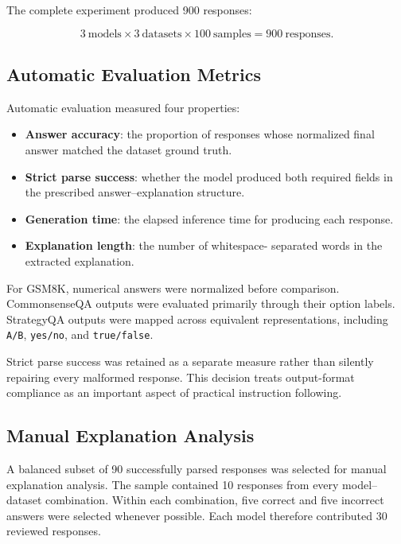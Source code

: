 \documentclass{article}
\begin{document}
The complete experiment produced 900 responses:

\[
3\ \text{models}
\times
3\ \text{datasets}
\times
100\ \text{samples}
=
900\ \text{responses}.
\]

\subsection{Automatic Evaluation Metrics}

Automatic evaluation measured four properties:

\begin{itemize}
    \item \textbf{Answer accuracy}: the proportion of responses whose
    normalized final answer matched the dataset ground truth.

    \item \textbf{Strict parse success}: whether the model produced
    both required fields in the prescribed answer--explanation
    structure.

    \item \textbf{Generation time}: the elapsed inference time for
    producing each response.

    \item \textbf{Explanation length}: the number of whitespace-
    separated words in the extracted explanation.
\end{itemize}

For GSM8K, numerical answers were normalized before comparison.
CommonsenseQA outputs were evaluated primarily through their option
labels. StrategyQA outputs were mapped across equivalent
representations, including \texttt{A/B}, \texttt{yes/no}, and
\texttt{true/false}.

Strict parse success was retained as a separate measure rather than
silently repairing every malformed response. This decision treats
output-format compliance as an important aspect of practical
instruction following.

\subsection{Manual Explanation Analysis}

A balanced subset of 90 successfully parsed responses was selected for
manual explanation analysis. The sample contained 10 responses from
every model--dataset combination. Within each combination, five correct
and five incorrect answers were selected whenever possible. Each model
therefore contributed 30 reviewed responses.
\end{document}
